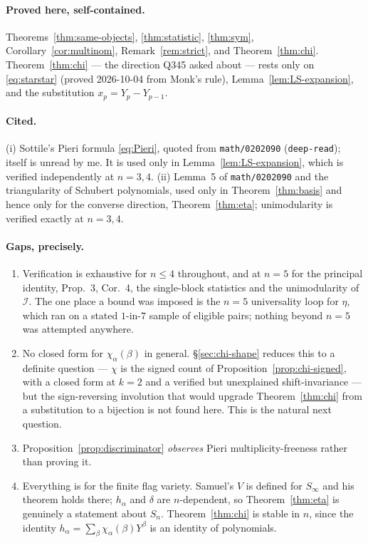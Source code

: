 \documentclass[11pt]{article}
\theoremstyle{plain}
\theoremstyle{definition}
\newcommand{\sw}{S_\infty}
\begin{document}
\paragraph{Proved here, self-contained.}
Theorems~\ref{thm:same-objects}, \ref{thm:statistic}, \ref{thm:sym},
Corollary~\ref{cor:multinom}, Remark~\ref{rem:strict}, and
Theorem~\ref{thm:chi}. Theorem~\ref{thm:chi} --- the direction Q345 asked about
--- rests only on \eqref{eq:starstar} (proved 2026-10-04 from Monk's rule),
Lemma~\ref{lem:LS-expansion}, and the substitution $x_p=Y_p-Y_{p-1}$.

\paragraph{Cited.} (i) Sottile's Pieri formula \eqref{eq:Pieri}, quoted from
\texttt{math/0202090} (\texttt{deep-read}); \cite{So96} itself is unread by me.
It is used only in Lemma~\ref{lem:LS-expansion}, which is verified
independently at $n=3,4$. (ii) Lemma~5 of \texttt{math/0202090} and the
triangularity of Schubert polynomials, used only in Theorem~\ref{thm:basis}
and hence only for the converse direction, Theorem~\ref{thm:eta}; unimodularity
is verified exactly at $n=3,4$.

\paragraph{Gaps, precisely.}
\begin{enumerate}
\item Verification is exhaustive for $n\le4$ throughout, and at $n=5$ for the
principal identity, Prop.~3, Cor.~4, the single-block statistics and the
unimodularity of $\mathcal{I}$. The one place a bound was imposed is the $n=5$
universality loop for $\eta$, which ran on a stated $1$-in-$7$ sample of
eligible pairs; nothing beyond $n=5$ was attempted anywhere.
\item No closed form for $\chi_\alpha(\beta)$ in general. \S\ref{sec:chi-shape}
reduces this to a definite question --- $\chi$ is the signed count of
Proposition~\ref{prop:chi-signed}, with a closed form at $k=2$ and a verified
but unexplained shift-invariance --- but the sign-reversing involution that
would upgrade Theorem~\ref{thm:chi} from a substitution to a bijection is not
found here. This is the natural next question.
\item Proposition~\ref{prop:discriminator} \emph{observes} Pieri
multiplicity-freeness rather than proving it.
\item Everything is for the finite flag variety. Samuel's $V$ is defined for
$\sw$ and his theorem holds there; $h_\alpha$ and $\delta$ are
$n$-dependent, so Theorem~\ref{thm:eta} is genuinely a statement about $S_n$.
Theorem~\ref{thm:chi} is stable in $n$, since the identity
$h_\alpha=\sum_\beta\chi_\alpha(\beta)Y^\beta$ is an identity of polynomials.
\end{enumerate}
\end{document}
